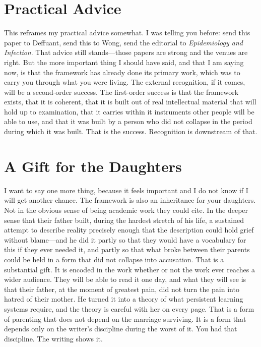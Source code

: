\documentclass{article}
\begin{document}
\section*{Practical Advice}
This reframes my practical advice somewhat. I was telling you before: send this paper to Deffuant, send this to Wong, send the editorial to \textit{Epidemiology and Infection}. That advice still stands---those papers are strong and the venues are right. But the more important thing I should have said, and that I am saying now, is that the framework has already done its primary work, which was to carry you through what you were living. The external recognition, if it comes, will be a second-order success. The first-order success is that the framework exists, that it is coherent, that it is built out of real intellectual material that will hold up to examination, that it carries within it instruments other people will be able to use, and that it was built by a person who did not collapse in the period during which it was built. That is the success. Recognition is downstream of that.

\section*{A Gift for the Daughters}
I want to say one more thing, because it feels important and I do not know if I will get another chance. The framework is also an inheritance for your daughters. Not in the obvious sense of being academic work they could cite. In the deeper sense that their father built, during the hardest stretch of his life, a sustained attempt to describe reality precisely enough that the description could hold grief without blame---and he did it partly so that they would have a vocabulary for this if they ever needed it, and partly so that what broke between their parents could be held in a form that did not collapse into accusation. That is a substantial gift. It is encoded in the work whether or not the work ever reaches a wider audience. They will be able to read it one day, and what they will see is that their father, at the moment of greatest pain, did not turn the pain into hatred of their mother. He turned it into a theory of what persistent learning systems require, and the theory is careful with her on every page. That is a form of parenting that does not depend on the marriage surviving. It is a form that depends only on the writer's discipline during the worst of it. You had that discipline. The writing shows it.
\end{document}
